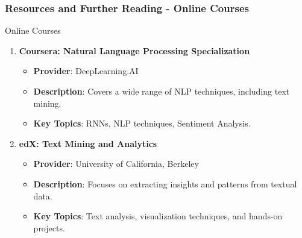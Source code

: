 \documentclass[aspectratio=169]{beamer}
\begin{document}
\begin{frame}[fragile]
    \frametitle{Resources and Further Reading - Online Courses}
    \begin{block}{Online Courses}
        \begin{enumerate}
            \item \textbf{Coursera: Natural Language Processing Specialization}
            \begin{itemize}
                \item \textbf{Provider}: DeepLearning.AI
                \item \textbf{Description}: Covers a wide range of NLP techniques, including text mining.
                \item \textbf{Key Topics}: RNNs, NLP techniques, Sentiment Analysis.
            \end{itemize}
            
            \item \textbf{edX: Text Mining and Analytics}
            \begin{itemize}
                \item \textbf{Provider}: University of California, Berkeley
                \item \textbf{Description}: Focuses on extracting insights and patterns from textual data.
                \item \textbf{Key Topics}: Text analysis, visualization techniques, and hands-on projects.
            \end{itemize}
        \end{enumerate}
    \end{block}
\end{frame}
\end{document}
